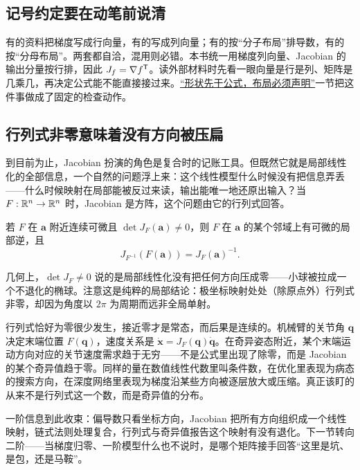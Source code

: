 \subsection{记号约定要在动笔前说清}

有的资料把梯度写成行向量，有的写成列向量；有的按``分子布局''排导数，有的按``分母布局''。两套都自洽，混用则必错。本书统一用梯度列向量、Jacobian 的输出分量按行排，因此 \(J_f=\nabla f^{\mathsf{T}}\)。读外部材料时先看一眼向量是行是列、矩阵是几乘几，再决定公式能不能直接接过来。\hyperref[sec:10-Matrix-Calculus/01-Derivative-Conventions/02]{``形状先于公式，布局必须声明''}一节把这件事做成了固定的检查动作。

\subsection{行列式非零意味着没有方向被压扁}

到目前为止，Jacobian 扮演的角色是复合时的记账工具。但既然它就是局部线性化的全部信息，一个自然的问题浮上来：这个线性模型什么时候没有把信息弄丢——什么时候映射在局部能被反过来读，输出能唯一地还原出输入？当 \(F:\mathbb{R}^n\to\mathbb{R}^n\) 时，Jacobian 是方阵，这个问题由它的行列式回答。

\begin{theorem}[逆函数定理]
若 \(F\) 在 \(\mathbf a\) 附近连续可微且 \(\det J_F(\mathbf a)\ne0\)，则 \(F\) 在 \(\mathbf a\) 的某个邻域上有可微的局部逆，且
\[
J_{F^{-1}}(F(\mathbf a))=J_F(\mathbf a)^{-1}.
\]
\end{theorem}

几何上，\(\det J_F\ne0\) 说的是局部线性化没有把任何方向压成零——小球被拉成一个不退化的椭球。注意这是纯粹的局部结论：极坐标映射处处（除原点外）行列式非零，却因为角度以 \(2\pi\) 为周期而远非全局单射。

行列式恰好为零很少发生，接近零才是常态，而后果是连续的。机械臂的关节角 \(\mathbf q\) 决定末端位置 \(F(\mathbf q)\)，速度关系是 \(\dot{\mathbf x}=J_F(\mathbf q)\dot{\mathbf q}\)。在奇异姿态附近，某个末端运动方向对应的关节速度需求趋于无穷——不是公式里出现了除零，而是 Jacobian 的某个奇异值趋于零。同样的量在数值线性代数里叫条件数，在优化里表现为病态的搜索方向，在深度网络里表现为梯度沿某些方向被逐层放大或压缩。真正该盯的从来不是行列式这一个数，而是奇异值的分布。

一阶信息到此收束：偏导数只看坐标方向，Jacobian 把所有方向组织成一个线性映射，链式法则处理复合，行列式与奇异值报告这个映射有没有退化。下一节转向二阶——当梯度归零、一阶模型什么也不说时，是哪个矩阵接手回答``这里是坑、是包，还是马鞍''。
